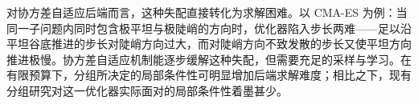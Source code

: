 对协方差自适应后端而言，这种失配直接转化为求解困难。以 CMA-ES 为例：当同一子问题内同时包含极平坦与极陡峭的方向时，优化器陷入步长两难——足以沿平坦谷底推进的步长对陡峭方向过大，而对陡峭方向不致发散的步长又使平坦方向推进极慢。协方差自适应机制能逐步缓解这种失配，但需要充足的采样与学习。在有限预算下，分组所决定的局部条件性可明显增加后端求解难度；相比之下，现有分组研究对这一优化器实际面对的局部条件性着墨甚少。